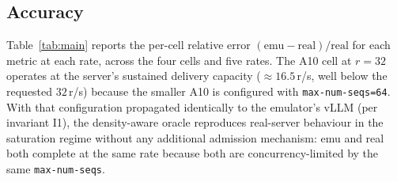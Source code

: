 \documentclass[conference]{IEEEtran}
\begin{document}
\subsection{Accuracy}
\label{sec:results-main}

Table~\ref{tab:main} reports the per-cell relative error
$(\text{emu}-\text{real})/\text{real}$ for each metric at each rate,
across the four cells and five rates. The A10 cell at $r=32$
operates at the server's sustained delivery capacity ($\approx
16.5$\,r/s, well below the requested $32$\,r/s) because the smaller
A10 is configured with \texttt{max-num-seqs=64}. With that
configuration propagated identically to the emulator's vLLM (per
invariant I1), the density-aware oracle reproduces real-server
behaviour in the saturation regime without any additional admission
mechanism: emu and real both complete at the same rate because both
are concurrency-limited by the same
\texttt{max-num-seqs}.
\end{document}
